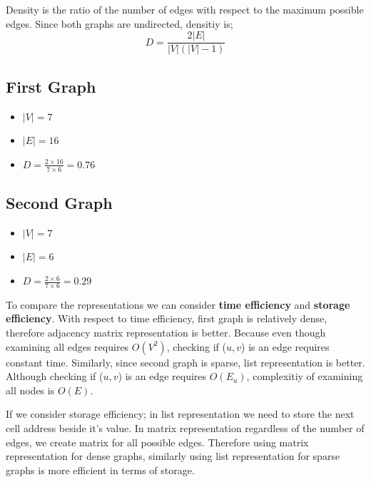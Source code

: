 \documentclass[a4paper,12pt]{extarticle}
\begin{document}
	\vspace{1em}

	\newpage

	\section{}

	Density is the ratio of the number of edges with respect to the maximum possible edges. Since both graphs are undirected, densitiy is; 
	$$D = \frac{2|E|}{|V|(|V|-1)}$$

	\subsection{First Graph}

	\begin{itemize}
		\item $|V| = 7$
		\item $|E| = 16$
		\item $D = \frac{2\times16}{7\times6} = 0.76$
	\end{itemize}

	\subsection{Second Graph}

	\begin{itemize}
		\item $|V| = 7$
		\item $|E| = 6$
		\item $D = \frac{2\times6}{7\times6} = 0.29$
	\end{itemize}

	To compare the representations we can consider \textbf{time efficiency} and \textbf{storage efficiency}. With respect to time efficiency, first graph is relatively dense, therefore adjacency matrix representation is better. Because even though examining all edges requires $O(V^2)$, checking if ($u, v$) is an edge requires constant time. Similarly, since second graph is sparse, list representation is better. Although checking if ($u, v$) is an edge requires $O(E_u)$, complexitiy of examining all nodes is $O(E)$.

	If we consider storage efficiency; in list representation we need to store the next cell address beside it's value. In matrix representation regardless of the number of edges, we create matrix for all possible edges. Therefore using matrix representation for dense graphs, similarly using list representation for sparse graphs is more efficient in terms of storage.
\end{document}
